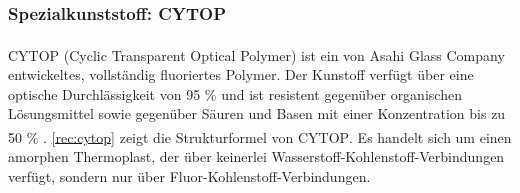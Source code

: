 \subsubsection{Spezialkunststoff: CYTOP\textsuperscript{\texttrademark}}
\label{subsec:pofcytop}

CYTOP\textsuperscript{\texttrademark} (Cyclic Transparent Optical Polymer) ist
ein von Asahi Glass Company entwickeltes, vollständig fluoriertes Polymer. Der
Kunstoff verfügt über eine optische Durchlässigkeit von 95 \% und ist resistent
gegenüber organischen Lösungsmittel sowie gegenüber Säuren und Basen mit einer
Konzentration bis zu 50 \% \cite{pofagc}. \autoref{rec:cytop} zeigt die
Strukturformel von CYTOP\textsuperscript{\texttrademark}. Es handelt sich um
einen amorphen Thermoplast, der über keinerlei
Wasserstoff-Kohlenstoff-Verbindungen verfügt, sondern nur über
Fluor-Kohlenstoff-Verbindungen.

